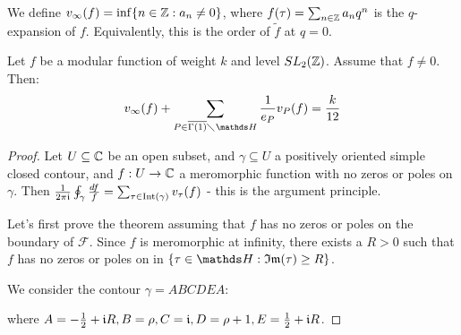 \documentclass[10pt,a4paper]{article}
\begin{document}
We define $v_\infty(f) = \inf \{n\in\mathbb{Z} : a_n \neq 0\}$, where $f(\tau) = \sum_{n\in \mathbb{Z}} a_nq^n$ is the $q$-expansion of $f$. Equivalently, this is the order of $\tilde{f}$ at $q=0$.
\begin{theorem}
  Let $f$ be a modular function of weight $k$ and level $SL_2(\mathbb{Z})$. Assume that $f\neq 0$. Then:
  \[v_\infty(f) + \sum_{P \in \overline{\Gamma(1)}\diagdown \H} \frac{1}{e_P}v_P(f) = \frac{k}{12}\]
\end{theorem}
\begin{proof}
  Let $U \subseteq \mathbb{C}$ be an open subset, and $\gamma \subseteq U$ a positively oriented simple closed contour, and $f:U \to \mathbb{C}$ a meromorphic function with no zeros or poles on $\gamma$. Then $\frac{1}{2\pi\mathfrak{i}}\oint_\gamma\frac{df}{f} = \sum_{\tau \in \operatorname{Int}(\gamma)} v_\tau(f)$ - this is the argument principle.

  Let's first prove the theorem assuming that $f$ has no zeros or poles on the boundary of $\mathscr{F}$. Since $f$ is meromorphic at infinity, there exists a $R > 0$ such that $f$ has no zeros or poles on in $\{\tau \in \H:\Im(\tau) \geq R\}$.

  We consider the contour $\gamma = ABCDEA$:
  \begin{center}
  \end{center}
  where $A = -\frac12 + \mathfrak{i} R, B = \rho, C = \mathfrak{i}, D = \rho + 1, E = \frac12 + \mathfrak{i} R$.


\end{proof}
\end{document}
